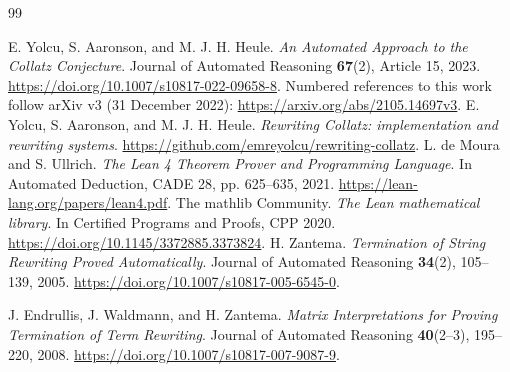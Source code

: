 \documentclass[11pt,a4paper]{article}
\begin{document}
\begin{thebibliography}{99}\small\raggedright
{} E. Yolcu, S. Aaronson, and M. J. H. Heule.
\emph{An Automated Approach to the Collatz Conjecture}.
Journal of Automated Reasoning \textbf{67}(2), Article 15, 2023.
\url{https://doi.org/10.1007/s10817-022-09658-8}.
Numbered references to this work follow arXiv v3 (31 December 2022):
\url{https://arxiv.org/abs/2105.14697v3}.
 E. Yolcu, S. Aaronson, and M. J. H. Heule.
\emph{Rewriting Collatz: implementation and rewriting systems}.
\url{https://github.com/emreyolcu/rewriting-collatz}.
 L. de Moura and S. Ullrich.
\emph{The Lean 4 Theorem Prover and Programming Language}.
In Automated Deduction, CADE 28, pp. 625--635, 2021.
\url{https://lean-lang.org/papers/lean4.pdf}.
 The mathlib Community.
\emph{The Lean mathematical library}.
In Certified Programs and Proofs, CPP 2020.
\url{https://doi.org/10.1145/3372885.3373824}.
 H. Zantema.
\emph{Termination of String Rewriting Proved Automatically}.
Journal of Automated Reasoning \textbf{34}(2), 105--139, 2005.
\url{https://doi.org/10.1007/s10817-005-6545-0}.

 J. Endrullis, J. Waldmann, and H. Zantema.
\emph{Matrix Interpretations for Proving Termination of Term Rewriting}.
Journal of Automated Reasoning \textbf{40}(2--3), 195--220, 2008.
\url{https://doi.org/10.1007/s10817-007-9087-9}.
\end{thebibliography}
\clearpage
\appendix
\end{document}
